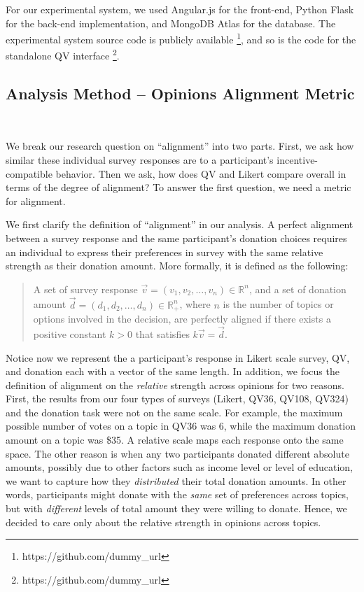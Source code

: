 For our experimental system, we used Angular.js for the front-end, Python Flask for the back-end implementation, and MongoDB Atlas for the database. The experimental system source code is publicly available \footnote{https://github.com/dummy\_url}, and so is the code for the standalone QV interface \footnote{https://github.com/dummy\_url}. 

\subsection{Analysis Method -- Opinions Alignment Metric}~\label{alignment_metric}

We break our research question on ``alignment'' into two parts. First, we ask how similar these individual survey responses are to a participant's incentive-compatible behavior. Then we ask, how does QV and Likert compare overall in terms of the degree of alignment? To answer the first question, we need a metric for alignment.

We first clarify the definition of ``alignment'' in our analysis. A perfect alignment between a survey response and the same participant's donation choices requires an individual to express their preferences in survey with the same relative strength as their donation amount. More formally, it is defined as the following:

\begin{quote}
    A set of survey response $\vec{v} = (v_1, v_2, \dots, v_n) \in \mathbb{R}^n$, and a set of donation amount $\vec{d} = (d_1, d_2, \dots, d_n)\in \mathbb{R}_{+}^n$, where $n$ is the number of topics or options involved in the decision, are perfectly aligned if there exists a positive constant $k>0$ that satisfies $k\vec{v} = \vec{d}$.
\end{quote}

Notice now we represent the a participant's response in Likert scale survey, QV, and donation each with a vector of the same length. In addition, we focus the definition of alignment on the \textit{relative} strength across opinions for two reasons. First, the results from our four types of surveys (Likert, QV36, QV108, QV324) and the donation task were not on the same scale. For example, the maximum possible number of votes on a topic in QV36 was 6, while the maximum donation amount on a topic was \$35. A relative scale maps each response onto the same space. The other reason is when any two participants donated different absolute amounts, possibly due to other factors such as income level or level of education, we want to capture how they \textit{distributed} their total donation amounts. In other words, participants might donate with the \textit{same} set of preferences across topics, but with \textit{different} levels of total amount they were willing to donate. Hence, we decided to care only about the relative strength in opinions across topics.

